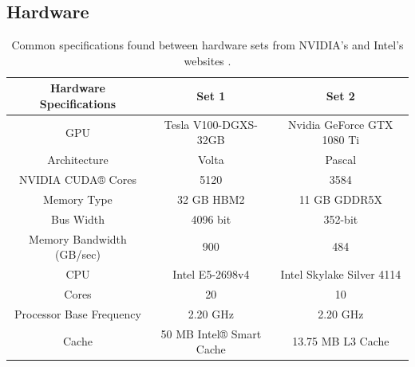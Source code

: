 \documentclass[review]{elsarticle}
\def\oldCPU{s}
\def\oldGPU{s}
\def\newCPU{s}
\def\newGPU{s}
\def\oldCPU{Intel Skylake Silver 4114} %
\def\oldGPU{Nvidia GeForce GTX 1080 Ti}
\def\newCPU{Intel E5-2698v4} %
\def\newGPU{Tesla V100-DGXS-32GB}
\begin{document}
\subsection{Hardware}
\label{AppendixB}
\begin{table}[htb!]
\begin{center}
\begin{tabular}{ |c|c|c| } 

 \hline
 Hardware Specifications & Set 1 & Set 2 \\ 
 \hline
 GPU & \newGPU{} & \oldGPU{} \\
 Architecture   & Volta &  Pascal \\
 NVIDIA CUDA® Cores  & 5120 &  3584 \\
 Memory Type   & 32 GB HBM2 &  11 GB GDDR5X \\
 Bus Width    & 4096 bit &  352-bit \\
 Memory Bandwidth (GB/sec)  & 900 &  484 \\ 
 \hline
 CPU & \newCPU{} & \oldCPU{} \\ 
 Cores & 20 & 10 \\
 Processor Base Frequency & 2.20 GHz & 2.20 GHz \\
 Cache & 50 MB Intel® Smart Cache & 13.75 MB L3 Cache\\
 \hline
\end{tabular}
\end{center}
\caption{\label{hardwareTable} Common specifications found between hardware sets from NVIDIA's and Intel's websites \cite{Intel123550,Intel91753,NVIDIANVIDIA,GeForceGeForce}.}
\end{table}
\end{document}
